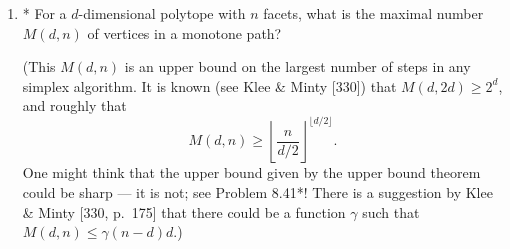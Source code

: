 \documentclass{article}
\begin{document}
\begin{enumerate}
\begin{solution}
\begin{enumerate}[label=(\roman*)]
    \item It suffices to show that for feasible bases $A_I, A_J \subseteq A$ with index sets $I$ and $J$, that for some different $i\in I \setminus J$ and $j\in J \setminus I$, $A_{I \cup  j  \setminus i}$ is also a feasible basis. For each facet $F_i \subseteq P$ write $V_i = \operatorname{vert}(F_i)$ as the set of vertices of the facet $F_i$. Thus we have $\bigcup_{i \in I} V_i = \{\bi{v}\}$. Namely, we know that for every other vertex $\bi{w} \neq \bi{v}$, there exists a facet $F_i$ where $\bi{w} \notin V_i$. 

    We claim that for every set $I$ for a feasible basis $A_I$, we can associate a unique facet (inequality) to an axial direction. Indeed, of both there are $d$, and this simply seen through performing $\operatorname{rref}(A_I)$. Thus we can always choose $i$ and $j$ such that $F_i$ and $F_j$ correspond to the same direction (in $A_I$ and $A_J$, respectively), which guaranteed that $A_{I \cup  j  \setminus i}$ is also a feasible basis. Thus we are done.

    \begin{remark}
        This is the bases exchange condition for a matroid. The ground set is the set of facets of $P$ containing $\bi{v}$ and the rank is $d$, as shown in part (i). Pretty cool.
    \end{remark}

    \item Let $E$ be the edge $(\bi{v}, \bi{w})$. It suffices to show that we can pick the index set $I$ of $A_I$ such that $\bi{w}$ is in all but one facet.

    
    
\end{enumerate}
\end{solution}

\item* For a $d$-dimensional polytope with $n$ facets, what is the maximal number $M(d,n)$ of vertices in a monotone path?

(This $M(d,n)$ is an upper bound on the largest number of steps in any simplex algorithm. It is known (see Klee \& Minty [330]) that $M(d,2d) \ge 2^d$, and roughly that
\[ M(d,n) \ge \left\lfloor \frac{n}{d/2} \right\rfloor^{\lfloor d/2 \rfloor}. \]
One might think that the upper bound given by the upper bound theorem could be sharp --- it is not; see Problem 8.41*! There is a suggestion by Klee \& Minty [330, p.~175] that there could be a function $\gamma$ such that $M(d,n) \le \gamma (n-d)d$.)


\end{enumerate}
\end{document}
